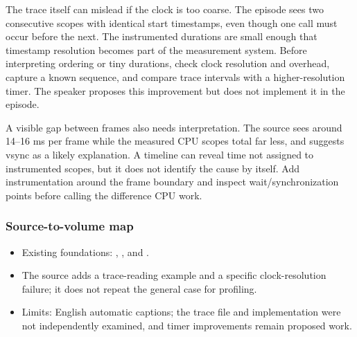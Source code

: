 The trace itself can mislead if the clock is too coarse. The episode sees two consecutive scopes with identical start timestamps, even though one call must occur before the next. The instrumented durations are small enough that timestamp resolution becomes part of the measurement system. Before interpreting ordering or tiny durations, check clock resolution and overhead, capture a known sequence, and compare trace intervals with a higher-resolution timer. The speaker proposes this improvement but does not implement it in the episode.

A visible gap between frames also needs interpretation. The source sees around 14--16 ms per frame while the measured CPU scopes total far less, and suggests vsync as a likely explanation. A timeline can reveal time not assigned to instrumented scopes, but it does not identify the cause by itself. Add instrumentation around the frame boundary and inspect wait/synchronization points before calling the difference CPU work.

\subsubsection{Source-to-volume map}\label{06-engine-ii-ch041-source-to-volume-map-1}

\hypertarget{06-engine-ii-ch041-source-to-volume-map-1}{}

\begin{itemize}
\tightlist
\item
  Existing foundations: , , and .
\item
  The source adds a trace-reading example and a specific clock-resolution failure; it does not repeat the general case for profiling.
\item
  Limits: English automatic captions; the trace file and implementation were not independently examined, and timer improvements remain proposed work.
\end{itemize}

